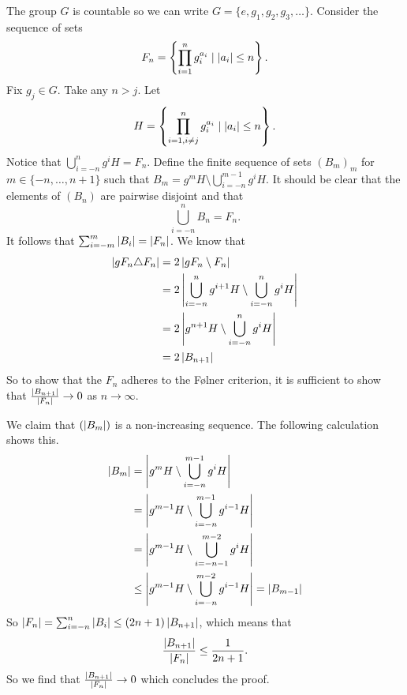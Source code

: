The group $G$ is countable so we can write $G = \{e, g_1, g_2, g_3, \dots\}$.
Consider the sequence of sets $$F_n = \left\{\prod_{i = 1}^n g_i^{a_i} \mid \left| a_i \right| \le n\right\}.$$ 
Fix $g_j \in G$. Take any $n > j$.
Let $$H = \left\{\prod_{i = 1, i \ne j}^n g_i^{a_i} \mid \left| a_i \right| \le n\right\}.$$
Notice that $\bigcup_{i = -n}^{n} g^{i}H = F_n$.
Define the finite sequence of sets $(B_m)_m$ for $m \in \{-n, \dots, n+1\}$ such that  
$B_m = g^mH \setminus \bigcup_{i=-n}^{m-1}g^iH$.
It should be clear that the elements of $(B_n)$ are pairwise disjoint and that  \[
    \bigcup_{i = -n}^n B_n = F_n 
.\] 
It follows that $\sum_{i=-m}^{m} \left| B_i \right| = \left| F_n \right|$. We know that 
\begin{align*}
    \left| gF_n \triangle F_n \right| &= 2 \left| gF_n \setminus F_n \right| \\
    &= 2 \left| \bigcup_{i = -n}^n g^{i+1}H \setminus \bigcup_{i = -n}^n g^{i}H \right|\\
    &=  2 \left| g^{n+1}H \setminus \bigcup_{i = -n}^n g^{i}H \right|\\
    &= 2 \left| B_{n+1} \right|
\end{align*}
So to show that the $F_n$ adheres to the Følner criterion, it is sufficient to show that $\frac{\left| B_{n+1} \right|}{\left| F_n \right|} \to 0$ as $n \to \infty$.

We claim that $(\left| B_m \right|)$ is a non-increasing sequence. The following calculation shows this.
\begin{align*}
    \left| B_m \right| &= \left| g^{m}H \setminus \bigcup_{i=-n}^{m-1}g^iH \right|\\
    &= \left| g^{m-1}H \setminus \bigcup_{i=-n}^{m-1}g^{i-1}H \right|\\
    &= \left| g^{m-1}H \setminus \bigcup_{i=-n-1}^{m-2}g^{i}H \right|\\
    &\le \left| g^{m-1}H \setminus \bigcup_{i=-n}^{m-2}g^{i-1}H \right| = \left| B_{m-1} \right|
\end{align*}
So $\left| F_n \right| = \sum_{i=-n}^{n} \left| B_i \right| \le (2n+1) \left| B_{n+1} \right|$, which means that $$\frac{\left| B_{n+1} \right|}{\left| F_n \right|} \le \frac{1}{2n+1}.$$
So we find that $\frac{\left| B_{n+1} \right|}{\left| F_n \right|} \to 0$ which concludes the proof. 
